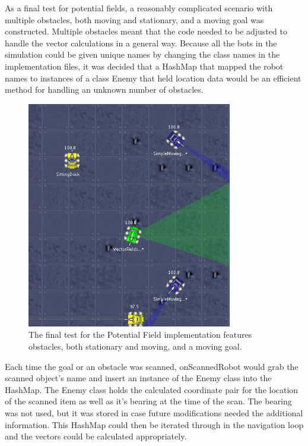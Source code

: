 \documentclass{aiaa-tc}%
\begin{document}
As a final test for potential fields, a reasonably complicated scenario with multiple obstacles, both moving and stationary, and a moving goal was constructed. Multiple obstacles meant that the code needed to be adjusted to handle the vector calculations in a general way. Because all the bots in the simulation could be given unique names by changing the class names in the implementation files, it was decided that a HashMap that mapped the robot names to instances of a class Enemy that held location data would be an efficient method for handling an unknown number of obstacles. 
\begin{figure}[htb]
\centering
\includegraphics[width=0.8\textwidth]{images/FinalRun}
\caption{The final test for the Potential Field implementation features obstacles, both stationary and moving, and a moving goal.}
\label{Radar Lock Example}
\end{figure} 
\clearpage
\noindent
Each time the goal or an obstacle was scanned, onScannedRobot would grab the scanned object's name and insert an instance of the Enemy class into the HashMap. The Enemy class holds the calculated coordinate pair for the location of the scanned item as well as it's bearing at the time of the scan. The bearing was not used, but it was stored in case future modifications needed the additional information. This HashMap could then be iterated through in the navigation loop and the vectors could be calculated appropriately. \\ \\
\end{document}
